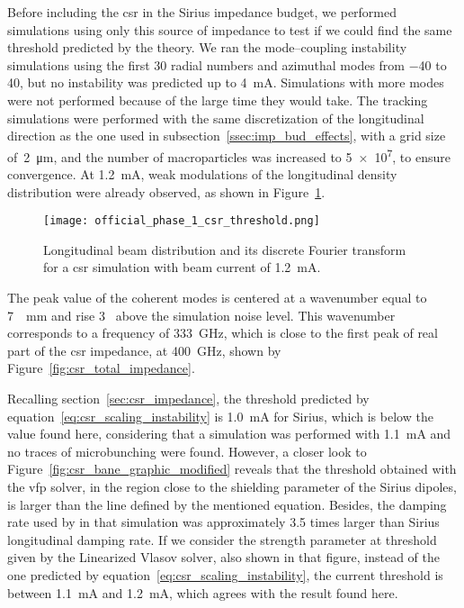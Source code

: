     Before including the \gls{csr} in the Sirius impedance budget, we performed simulations using only this source of impedance to test if we could find the same threshold predicted by the theory. We ran the mode--coupling instability simulations using the first \num{30} radial numbers and  azimuthal modes from \num{-40} to \num{40}, but no instability was predicted up to \SI{4}{\milli\ampere}. Simulations with more modes were not performed because of the large time they would take. The tracking simulations were performed with the same discretization of the longitudinal direction as the one used in subsection~\ref{ssec:imp_bud_effects}, with a grid size of~\SI{2}{\micro\meter}, and the number of macroparticles was increased to \num{5e7}, to ensure convergence. At \SI{1.2}{\milli\ampere}, weak modulations of the longitudinal density distribution were already observed, as shown in Figure~\ref{fig:ph1_csr_threshold}.
    \begin{figure}
        \centering
        \texttt{[image: official\_phase\_1\_csr\_threshold.png]}
        \caption{Longitudinal beam distribution and its discrete Fourier transform for a \gls{csr} simulation with beam current of \SI{1.2}{\milli\ampere}.}
        \label{fig:ph1_csr_threshold}
    \end{figure}
    The peak value of the coherent modes is centered at a wavenumber equal to \SI{7}{\per\milli\meter} and rise \si{3\times} above the simulation noise level. This wavenumber corresponds to a frequency of \SI{333}{\giga\hertz}, which is close to the first peak of real part of the \gls{csr} impedance, at \SI{400}{\giga\hertz}, shown by Figure~\ref{fig:csr_total_impedance}.

    Recalling section~\ref{sec:csr_impedance}, the threshold predicted by equation~\eqref{eq:csr_scaling_instability} is \SI{1.0}{\milli\ampere} for Sirius, which is below the value found here, considering that a simulation was performed with \SI{1.1}{\milli\ampere} and no traces of microbunching were found.
    However, a closer look to Figure~\ref{fig:csr_bane_graphic_modified} reveals that the threshold obtained with the \gls{vfp} solver, in the region close to the shielding parameter of the Sirius dipoles, is larger than the line defined by the mentioned equation. Besides, the damping rate used by  in that simulation was approximately \num{3.5} times larger than Sirius longitudinal damping rate. If we consider the strength parameter at threshold given by the Linearized Vlasov solver, also shown in that figure, instead of the one predicted by equation~\eqref{eq:csr_scaling_instability}, the current threshold is between \SI{1.1}{\milli\ampere} and \SI{1.2}{\milli\ampere}, which agrees with the result found here.

